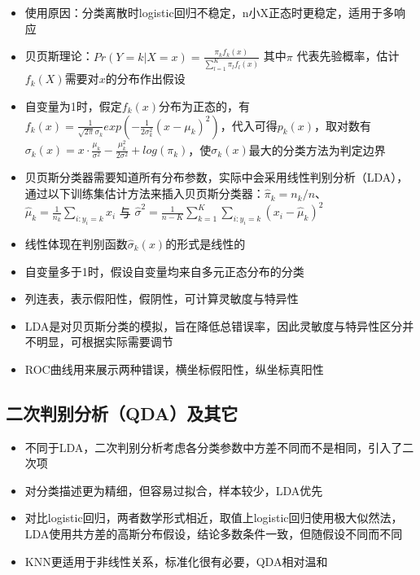 \documentclass[]{book}
\providecommand{\tightlist}{%
  \setlength{\itemsep}{0pt}\setlength{\parskip}{0pt}}
\begin{document}
\begin{itemize}
\tightlist
\item
  使用原因：分类离散时logistic回归不稳定，n小X正态时更稳定，适用于多响应
\item
  贝页斯理论：\(Pr(Y = k|X = x) = \frac{\pi_k f_k(x)}{\sum_{l = 1}^K \pi_lf_l(x)}\) 其中\(\pi\) 代表先验概率，估计\(f_k(X)\)需要对\(x\)的分布作出假设
\item
  自变量为1时，假定\(f_k(x)\)分布为正态的，有\(f_k(x) = \frac{1}{\sqrt{2 \pi} \sigma_k} exp(- \frac{1}{2 \sigma_k^2} (x - \mu_k)^2)\)，代入可得\(p_k(x)\)，取对数有\(\sigma_k(x) = x \cdot \frac{\mu_k}{\sigma^2} - \frac{\mu_k^2}{2\sigma^2} + log(\pi_k)\)，使\(\sigma_k(x)\)最大的分类方法为判定边界
\item
  贝页斯分类器需要知道所有分布参数，实际中会采用线性判别分析（LDA），通过以下训练集估计方法来插入贝页斯分类器：\(\hat \pi_k = n_k/n\)、\(\hat \mu_k = \frac{1}{n_k} \sum_{i:y_i = k} x_i\) 与 \(\hat \sigma^2 = \frac{1}{n - K} \sum_{k = 1}^K \sum_{i:y_i = k} (x_i - \hat \mu_k)^2\)
\item
  线性体现在判别函数\(\hat \sigma_k(x)\)的形式是线性的
\item
  自变量多于1时，假设自变量均来自多元正态分布的分类
\item
  列连表，表示假阳性，假阴性，可计算灵敏度与特异性
\item
  LDA是对贝页斯分类的模拟，旨在降低总错误率，因此灵敏度与特异性区分并不明显，可根据实际需要调节
\item
  ROC曲线用来展示两种错误，横坐标假阳性，纵坐标真阳性
\end{itemize}

\hypertarget{ux4e8cux6b21ux5224ux522bux5206ux6790qdaux53caux5176ux5b83}{%
\subsection{二次判别分析（QDA）及其它}\label{ux4e8cux6b21ux5224ux522bux5206ux6790qdaux53caux5176ux5b83}}

\begin{itemize}
\tightlist
\item
  不同于LDA，二次判别分析考虑各分类参数中方差不同而不是相同，引入了二次项
\item
  对分类描述更为精细，但容易过拟合，样本较少，LDA优先
\item
  对比logistic回归，两者数学形式相近，取值上logistic回归使用极大似然法，LDA使用共方差的高斯分布假设，结论多数条件一致，但随假设不同而不同
\item
  KNN更适用于非线性关系，标准化很有必要，QDA相对温和
\end{itemize}
\end{document}
